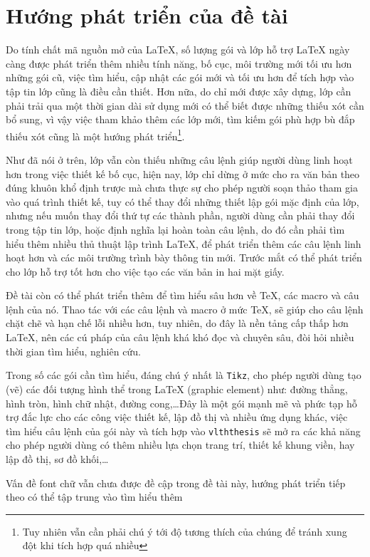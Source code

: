 \section{Hướng phát triển của đề tài}\label{sec:4.2}
Do tính chất mã nguồn mở của LaTeX, số lượng gói và lớp hỗ trợ LaTeX ngày càng được phát triển thêm 
nhiều tính năng, bố cục, môi trường mới tối ưu hơn những gói cũ, việc tìm hiểu, cập nhật các gói mới và tối ưu hơn để tích
hợp vào tập tin lớp cũng là điều cần thiết. Hơn nữa, do chỉ mới được xây dựng, lớp cần phải trải qua một thời gian dài sử dụng
mới có thể biết được những thiếu xót cần bổ sung, vì vậy việc tham khảo thêm các lớp mới, tìm kiếm gói phù hợp
bù đắp thiếu xót cũng là một hướng phát triển\footnote{Tuy nhiên vẫn cần phải chú ý tới độ tương thích của chúng để tránh
xung đột khi tích hợp quá nhiều}.\par
Như đã nói ở trên, lớp vẫn còn thiếu những câu lệnh giúp người dùng linh hoạt hơn trong việc thiết kế bố cục, hiện nay,
lớp chỉ dừng ở mức cho ra văn bản theo đúng khuôn khổ định trược mà chưa thực sự cho phép người soạn thảo tham gia
vào quá trình thiết kế, tuy có thể thay đổi những thiết lập gói mặc định của lớp, nhưng nếu muốn thay đổi thứ tự 
các thành phần, người dùng cần phải thay đổi trong tập tin lớp, hoặc định nghĩa lại hoàn toàn câu lệnh, do đó cần phải
tìm hiểu thêm nhiều thủ thuật lập trình LaTeX, để phát triển thêm các câu lệnh linh hoạt hơn và các môi trường trình bày
thông tin mới. Trước mắt có thể phát triển cho lớp hỗ trợ tốt hơn cho việc tạo các văn bản in hai mặt giấy.\par
Đề tài còn có thể phát triển thêm để tìm hiểu sâu hơn về TeX, các macro và câu lệnh của nó. Thao tác với các câu lệnh và macro
ở mức TeX, sẽ giúp cho câu lệnh chặt chẽ và hạn chế lỗi nhiều hơn, tuy nhiên, do đây là nền tảng cấp thấp hơn LaTeX, nên các
cú pháp của câu lệnh khá khó đọc và chuyên sâu, đòi hỏi nhiều thời gian tìm hiểu, nghiên cứu.\par
Trong số các gói cần tìm hiểu, đáng chú ý nhất là \texttt{Tikz}, cho phép người dùng tạo (vẽ) các đối
tượng hình thể trong LaTeX (graphic element) như: đường thẳng, hình tròn, hình chữ nhật, đường cong,\dots Đây là một
gói mạnh mẽ và phức tạp hỗ trợ đắc lực cho các công việc thiết kế, lập đồ thị và nhiều ứng dụng khác, việc tìm
hiểu câu lệnh của gói này và tích hợp vào \texttt{vlththesis} sẽ mở ra các khả năng cho phép người dùng có thêm nhiều lựa chọn trang
trí, thiết kế khung viền, hay lập đồ thị, sơ đồ khối,\dots \par
Vấn đề font chữ vẫn chưa được đề cập trong đề tài này, hướng phát triển tiếp theo có thể tập trung vào tìm hiểu thêm
